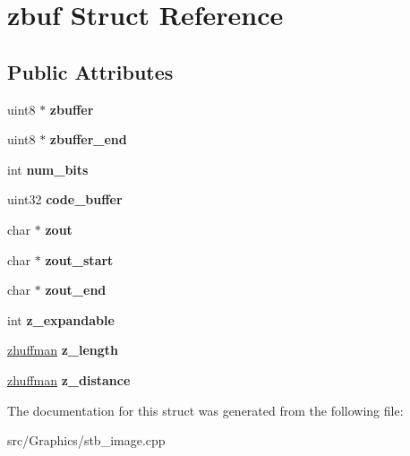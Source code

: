 \hypertarget{structzbuf}{\section{zbuf Struct Reference}
\label{structzbuf}
}
\subsection*{Public Attributes}
\begin{DoxyCompactItemize}
\item 
\hypertarget{structzbuf_a7080eb91dcc67e1dfe818d08e6f22c4e}{uint8 $\ast$ {\bfseries zbuffer}}\label{structzbuf_a7080eb91dcc67e1dfe818d08e6f22c4e}

\item 
\hypertarget{structzbuf_af030baa17bebedd18272678da17a33f4}{uint8 $\ast$ {\bfseries zbuffer\+\_\+end}}\label{structzbuf_af030baa17bebedd18272678da17a33f4}

\item 
\hypertarget{structzbuf_acd069cdb4100884a732ad2794edbbdff}{int {\bfseries num\+\_\+bits}}\label{structzbuf_acd069cdb4100884a732ad2794edbbdff}

\item 
\hypertarget{structzbuf_a3bb8244d7be17801079c5a8587182edb}{uint32 {\bfseries code\+\_\+buffer}}\label{structzbuf_a3bb8244d7be17801079c5a8587182edb}

\item 
\hypertarget{structzbuf_aaf137c25fa5b9fb14e92354da4203c38}{char $\ast$ {\bfseries zout}}\label{structzbuf_aaf137c25fa5b9fb14e92354da4203c38}

\item 
\hypertarget{structzbuf_af31571e8d74c78c9bb18d92205150b28}{char $\ast$ {\bfseries zout\+\_\+start}}\label{structzbuf_af31571e8d74c78c9bb18d92205150b28}

\item 
\hypertarget{structzbuf_af07c0b7b7227f670ee1413bc0dcab791}{char $\ast$ {\bfseries zout\+\_\+end}}\label{structzbuf_af07c0b7b7227f670ee1413bc0dcab791}

\item 
\hypertarget{structzbuf_ae662f24e0973ca19b543e64647a6bfb6}{int {\bfseries z\+\_\+expandable}}\label{structzbuf_ae662f24e0973ca19b543e64647a6bfb6}

\item 
\hypertarget{structzbuf_a5906bdbe9dfb565339acac51af9efe89}{\hyperlink{structzhuffman}{zhuffman} {\bfseries z\+\_\+length}}\label{structzbuf_a5906bdbe9dfb565339acac51af9efe89}

\item 
\hypertarget{structzbuf_ae7d9588b2548708e14f3c6ad89bf26b5}{\hyperlink{structzhuffman}{zhuffman} {\bfseries z\+\_\+distance}}\label{structzbuf_ae7d9588b2548708e14f3c6ad89bf26b5}

\end{DoxyCompactItemize}


The documentation for this struct was generated from the following file\+:\begin{DoxyCompactItemize}
\item 
src/\+Graphics/stb\+\_\+image.\+cpp\end{DoxyCompactItemize}
